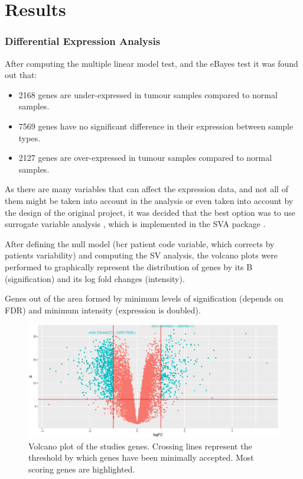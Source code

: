\documentclass[9pt,twocolumn,twoside]{gsajnl}
\begin{document}
\section*{Results}
\subsubsection*{Differential Expression Analysis}

After computing the multiple linear model test, and the eBayes test \cite{limma} 	it was found out that:

\begin{itemize}
\item 2168 genes are under-expressed in tumour samples compared to normal samples.
\item 7569 genes have no significant difference in their expression between sample types.
\item 2127 genes are over-expressed in tumour samples compared to normal samples.
\end{itemize}

As there are many variables that can affect the expression data, and not all of them might be taken into account in the analysis or even taken into account by the design of the original project, it was decided that the best option was to use surrogate variable analysis \cite{leek2007capturing}, which is implemented in the SVA package \cite{SVA}.


After defining the null model (bcr patient code variable, which corrects by patients variability) and computing the SV analysis, the volcano plots were performed to graphically represent the distribution of genes by its B (signification) and its log fold changes (intensity).

Genes out of the area formed by minimum levels of signification (depends on FDR) and minimum intensity (expression is doubled).


\begin{figure}[htbp]
\centering
\includegraphics[width=\linewidth]{Volcano.eps}
\caption{Volcano plot of the studies genes. Crossing lines represent the threshold by which genes have been minimally accepted. Most scoring genes are highlighted.
}
\label{fig:Volcano plot}
\end{figure}
\end{document}
